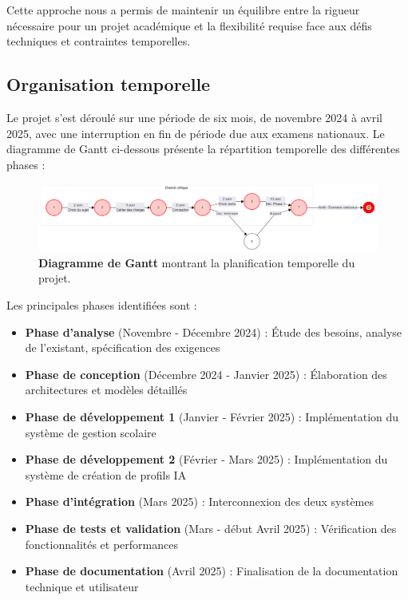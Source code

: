Cette approche nous a permis de maintenir un équilibre entre la rigueur nécessaire pour un projet académique et la flexibilité requise face aux défis techniques et contraintes temporelles.

\subsection{Organisation temporelle}

Le projet s'est déroulé sur une période de six mois, de novembre 2024 à avril 2025, avec une interruption en fin de période due aux examens nationaux. Le diagramme de Gantt ci-dessous présente la répartition temporelle des différentes phases :

\begin{figure}[H]
  \centering
  \includegraphics[width=1.0\textwidth,keepaspectratio]{pfe-pics/diagrames/Mermaid Chart - Create complex, visual diagrams with text. A smarter way of creating diagrams.-2025-06-10-203658.png}
  \caption{\textbf{Diagramme de Gantt} montrant la planification temporelle du projet.}
  \label{fig:gantt_chart}
\end{figure}

Les principales phases identifiées sont :

\begin{itemize}
  \item \textbf{Phase d'analyse} (Novembre - Décembre 2024) : Étude des besoins, analyse de l'existant, spécification des exigences
  
  \item \textbf{Phase de conception} (Décembre 2024 - Janvier 2025) : Élaboration des architectures et modèles détaillés
  
  \item \textbf{Phase de développement 1} (Janvier - Février 2025) : Implémentation du système de gestion scolaire
  
  \item \textbf{Phase de développement 2} (Février - Mars 2025) : Implémentation du système de création de profils IA
  
  \item \textbf{Phase d'intégration} (Mars 2025) : Interconnexion des deux systèmes
  
  \item \textbf{Phase de tests et validation} (Mars - début Avril 2025) : Vérification des fonctionnalités et performances
  
  \item \textbf{Phase de documentation} (Avril 2025) : Finalisation de la documentation technique et utilisateur
\end{itemize}

